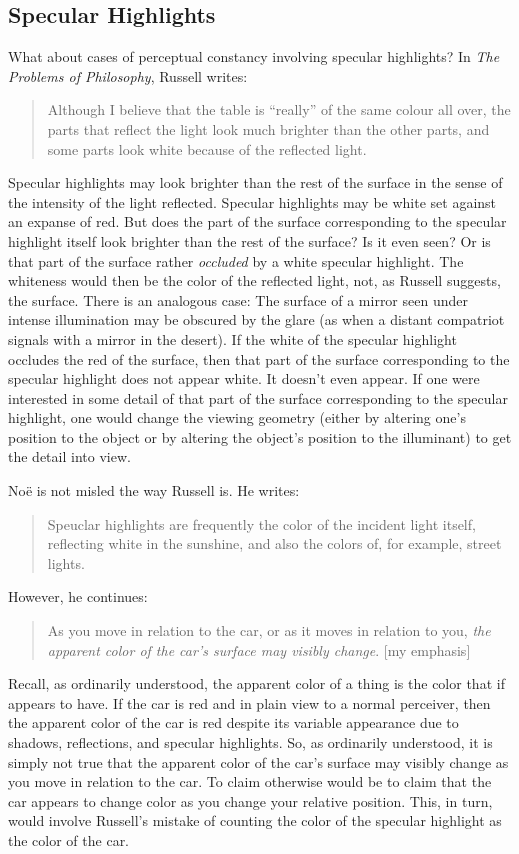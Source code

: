 \documentclass[12pt]{article}
\begin{document}

\subsection{Specular Highlights} %
\label{sub:specular_highlights}

What about cases of perceptual constancy involving specular highlights? In \emph{The Problems of Philosophy}, Russell writes:
	\begin{quote}
		Although I believe that the table is ``really'' of the same colour all over, the parts that reflect the light look much brighter than the other parts, and some parts look white because of the reflected light. \citep[2]{Russell:1912uq}
	\end{quote}
Specular highlights may look brighter than the rest of the surface in the sense of the intensity of the light reflected. Specular highlights may be white set against an expanse of red. But does the part of the surface corresponding to the specular highlight itself look brighter than the rest of the surface? Is it even seen? Or is that part of the surface rather \emph{occluded} by a white specular highlight. The whiteness would then be the color of the reflected light, not, as Russell suggests, the surface. There is an analogous case: The surface of a mirror seen under intense illumination may be obscured by the glare (as when a distant compatriot signals with a mirror in the desert). If the white of the specular highlight occludes the red of the surface, then that part of the surface corresponding to the specular highlight does not appear white. It doesn't even appear. If one were interested in some detail of that part of the surface corresponding to the specular highlight, one would change the viewing geometry (either by altering one's position to the object or by altering the object's position to the illuminant) to get the detail into view.

Noë is not misled the way Russell is. He writes:
	\begin{quote}
		Speuclar highlights are frequently the color of the incident light itself, reflecting white in the sunshine, and also the colors of, for example, street lights. \citep[125]{Noe:2004fk}
	\end{quote}
However, he continues:
	\begin{quote}
		As you move in relation to the car, or as it moves in relation to you, \emph{the apparent color of the car's surface may visibly change}. [my emphasis] \citep[125]{Noe:2004fk}
	\end{quote}
Recall, as ordinarily understood, the apparent color of a thing is the color that if appears to have. If the car is red and in plain view to a normal perceiver, then the apparent color of the car is red despite its variable appearance due to shadows, reflections, and specular highlights. So, as ordinarily understood, it is simply not true that the apparent color of the car's surface may visibly change as you move in relation to the car. To claim otherwise would be to claim that the car appears to change color as you change your relative position. This, in turn, would involve Russell's mistake of counting the color of the specular highlight as the color of the car. 
\end{document}
